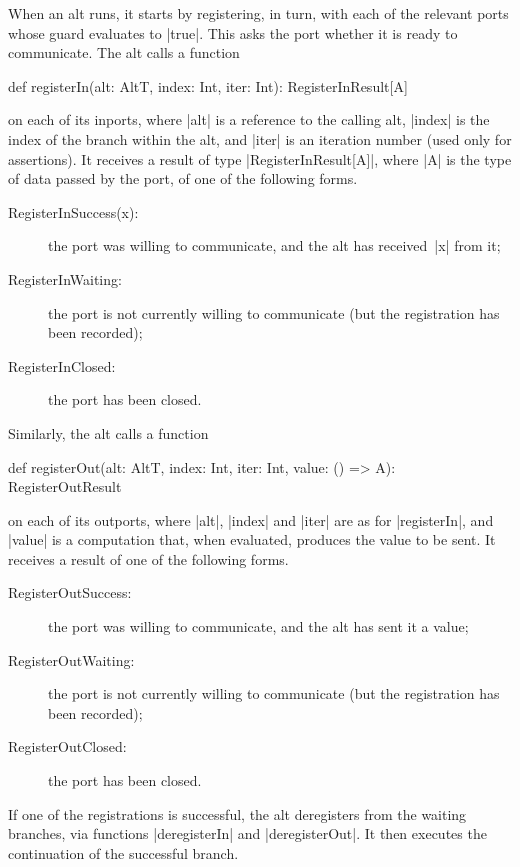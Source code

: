 When an alt runs, it starts by registering, in turn, with each of the relevant
ports whose guard evaluates to |true|.  This asks the port whether it is ready
to communicate.  The alt calls a function
%
\begin{scala}
def registerIn(alt: AltT, index: Int, iter: Int): RegisterInResult[A]  
\end{scala}
%
on each of its inports, where |alt| is a reference to the calling alt, |index|
is the index of the branch within the alt, and |iter| is an iteration number
(used only for assertions).  It receives a result of type
|RegisterInResult[A]|, where |A| is the type of data passed by the port, of
one of the following forms.
%
\begin{description}
\item[{\scalastyle RegisterInSuccess(x)}:] the port was willing to
  communicate, and the alt has received~|x| from it;

\item[{\scalastyle RegisterInWaiting}:] the port is not currently willing to
  communicate (but the registration has been recorded); 

\item[{\scalastyle RegisterInClosed}:] the port has been closed.
\end{description}
%
Similarly, the alt calls a function
%
\begin{scala}
def registerOut(alt: AltT, index: Int, iter: Int, value: () => A): RegisterOutResult
\end{scala}
on each of its outports, where |alt|, |index| and |iter| are as for
|registerIn|, and |value| is a computation that, when evaluated, produces the
value to be sent.  It receives a result of one of the following forms.
%
\begin{description}
\item[{\scalastyle RegisterOutSuccess}:] the port was willing to
  communicate, and the alt has sent it a value;

\item[{\scalastyle RegisterOutWaiting}:] the port is not currently willing to
  communicate (but the registration has been recorded); 

\item[{\scalastyle RegisterOutClosed}:] the port has been closed.
\end{description}

If one of the registrations is successful, the alt deregisters from the
waiting branches, via functions |deregisterIn| and |deregisterOut|.  It then
executes the continuation of the successful branch.  

